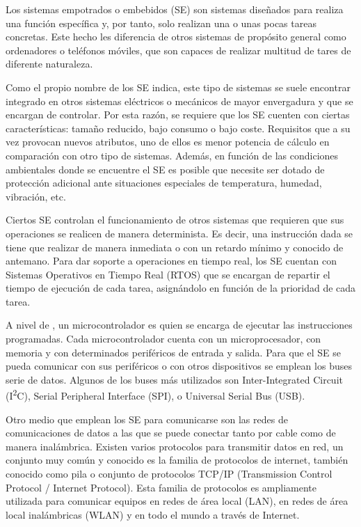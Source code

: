 \label{ch:introduccion}
Los sistemas empotrados o embebidos (SE) son sistemas diseñados para realiza una
función específica y, por tanto, solo realizan una o unas pocas tareas
concretas. Este hecho les diferencia de otros sistemas de propósito general como
ordenadores o teléfonos móviles, que son capaces de realizar multitud de tares
de diferente naturaleza. 

Como el propio nombre de los SE indica, este tipo de sistemas se suele encontrar
integrado en otros sistemas eléctricos o mecánicos de mayor envergadura y que se
encargan de controlar. Por esta razón, se requiere que los SE cuenten con 
ciertas características: tamaño reducido, bajo consumo o bajo coste. Requisitos
que a su vez provocan nuevos atributos, uno de ellos es menor potencia de
cálculo en comparación con otro tipo de sistemas. Además, en función de las
condiciones ambientales donde se encuentre el SE es posible que necesite ser
dotado de protección adicional ante situaciones especiales de temperatura,
humedad, vibración, etc.

Ciertos SE controlan el funcionamiento de otros sistemas que requieren que sus
operaciones se realicen de manera determinista. Es decir, una instrucción dada
se tiene que realizar de manera inmediata o con un retardo mínimo y conocido de
antemano. Para dar soporte a operaciones en tiempo real, los SE cuentan con
Sistemas Operativos en Tiempo Real (RTOS) que se encargan de repartir el tiempo
de ejecución de cada tarea, asignándolo en función de la prioridad de cada
tarea.

A nivel de , un microcontrolador es quien se encarga de
ejecutar las instrucciones programadas. Cada microcontrolador cuenta con un
microprocesador, con memoria y con determinados periféricos de entrada y salida.
Para que el SE se pueda comunicar con sus periféricos o con otros dispositivos
se emplean los buses serie de datos. Algunos de los buses más utilizados son
Inter-Integrated Circuit (I\textsuperscript{2}C), Serial Peripheral Interface
(SPI), o Universal Serial Bus (USB).

Otro medio que emplean los SE para comunicarse son las redes de comunicaciones
de datos a las que se puede conectar tanto por cable como de manera
inalámbrica. Existen varios protocolos para transmitir datos en red, un conjunto
muy común y conocido es la familia de protocolos de internet, también
conocido como pila o conjunto de protocolos TCP/IP
(Transmission Control Protocol / Internet Protocol). Esta familia de protocolos
es ampliamente utilizada para comunicar equipos en redes de área local (LAN), en
redes de área local inalámbricas (WLAN) y en todo el mundo a través de Internet.

